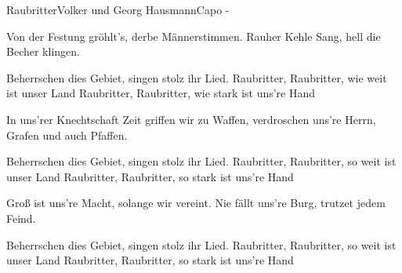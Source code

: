 \begin{song}{Raubritter}{Volker und Georg Hausmann}{Capo -}

Von der Festung gröhlt's, derbe Männerstimmen.
Rauher Kehle Sang, hell die Becher klingen.

Beherrschen dies Gebiet, singen stolz ihr Lied.
Raubritter, Raubritter, wie weit ist unser Land
Raubritter, Raubritter, wie stark ist uns're Hand

In uns'rer Knechtschaft Zeit griffen wir zu Waffen,
verdroschen uns're Herrn, Grafen und auch Pfaffen.

Beherrschen dies Gebiet, singen stolz ihr Lied.
Raubritter, Raubritter, so weit ist unser Land
Raubritter, Raubritter, so stark ist uns're Hand

Groß ist uns're Macht, solange wir vereint.
Nie fällt uns're Burg, trutzet jedem Feind.

Beherrschen dies Gebiet, singen stolz ihr Lied.
Raubritter, Raubritter, so weit ist unser Land
Raubritter, Raubritter, so stark ist uns're Hand
\end{song}
